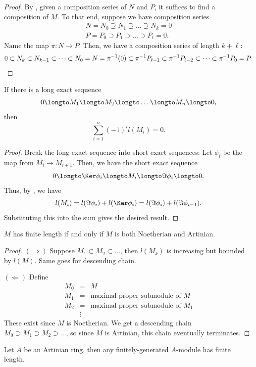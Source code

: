 \begin{proof}
    By ,
    given a composition series of $N$ and $P$,
    it suffices to find a composition of $M$.
    To that end, suppose we have composition series
    \begin{align*}
        N = N_0\supsetneq N_1\supsetneq \dots \supsetneq N_k=0 \\
	P = P_0\supset P_1\supset\dots\supset P_\ell = 0.
    \end{align*}
    Name the map $\pi : N\to P$.
    Then, we have a composition series of length $k+\ell$:
    \[0\subset N_k\subset N_{k-1}\subset
    \dots\subset N_0=N=\pi^{-1}(0)
    \subset \pi^{-1}P_{\ell-1}
	\subset \pi^{-1}P_{\ell-2}
    \subset\dots\subset \pi^{-1}P_0 = P.\qedhere\]
\end{proof}
\begin{corollary}
    \label{cor:length_exact}
    If there is a long exact sequence
    $$0\longto M_1 \longto M_2 \longto \dots\longto M_n\longto 0,$$
    then 
    $$\sum_{i=1}^n (-1)^i l(M_i) = 0.$$
\end{corollary}
\begin{proof}
    Break the long exact sequence into short exact sequences:
    Let $\phi_i$ be the map from $M_i\to M_{i+1}$.
    Then, we have the short exact sequence
    $$0\longto \Ker\phi_i\longto M_i\longto \Im\phi_i\longto 0.$$
    Thus, by , we have
    $$l(M_i) = l(\Im\phi_i) + l(\Ker\phi_i)
    = l(\Im\phi_i) + l(\Im\phi_{i-1}).$$
    Substituting this into the sum gives the desired result.
\end{proof}
\begin{proposition}
    $M$ has finite length if and only if $M$ is both
    Noetherian and Artinian.
\end{proposition}
\begin{proof}
    $(\Rightarrow)$
    Suppose $M_1\subset M_2\subset\dots$,
    then $l(M_k)$ is increasing but bounded by $l(M)$.
    Same goes for descending chain.

    $(\Leftarrow)$
    Define
    $$\begin{array}{rcl}
	M_0 &=& M \\[4pt]
	M_1 &=& \text{maximal proper submodule of } M \\[4pt]
	M_2 &=& \text{maximal proper submodule of } M_1 \\[4pt]
	    &\vdots&
    \end{array}$$
    These exist since $M$ is Noetherian.
    We get a descending chain
    $M_0\supset M_1\supset M_2\supset\dots$,
    so since $M$ is Artinian,
    this chain eventually terminates.
\end{proof}
\begin{corollary}
    \label{cor:artinian_finite_length}
    Let $A$ be an Artinian ring,
    then any finitely-generated $A$-module
    has finite length.
\end{corollary}
%
%
%
%
